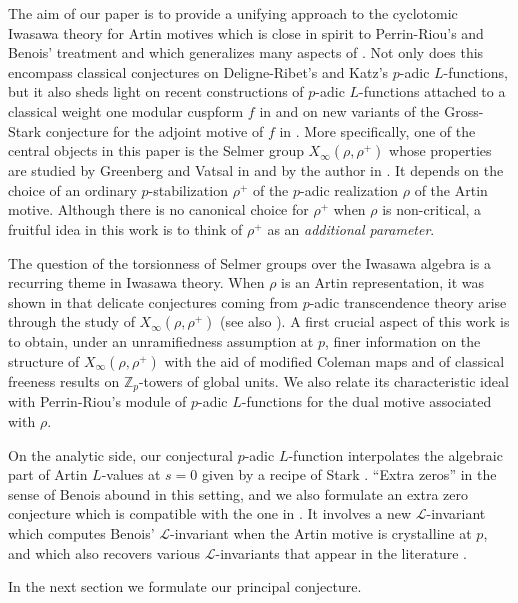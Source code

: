 \documentclass[12pt]{amsart}
\newcommand\Zp{{\mathbb{Z}_p}}
\newcommand\cL{\mathcal{L}}
\theoremstyle{defstyle}
\theoremstyle{thmstyle}
\begin{document}
The aim of our paper is to provide a unifying approach to the cyclotomic Iwasawa theory for Artin motives which is close in spirit to Perrin-Riou's and Benois' treatment and which generalizes many aspects of \cite{BKSANT,buyukboduksakamoto}. Not only does this encompass classical conjectures on Deligne-Ribet's and Katz's $p$-adic $L$-functions, but it also sheds light on recent constructions of $p$-adic $L$-functions attached to a classical weight one modular cuspform $f$ in \cite{bellaiche2016eigencurve,maks} and on new variants of the Gross-Stark conjecture for the adjoint motive of $f$ in \cite{DLR2}. More specifically, one of the central objects in this paper is the Selmer group $X_\infty(\rho,\rho^+)$ whose properties are studied by Greenberg and Vatsal in \cite{GV2020} and by the author in \cite{maks}. It depends on the choice of an ordinary $p$-stabilization $\rho^+$ of the $p$-adic realization $\rho$ of the Artin motive. Although there is no canonical choice for $\rho^+$ when $\rho$ is non-critical, a fruitful idea in this work is to think of $\rho^+$ as an \textit{additional parameter}. 

The question of the torsionness of Selmer groups over the Iwasawa algebra is a recurring theme in Iwasawa theory. When $\rho$ is an Artin representation, it was shown in \cite{maks} that delicate conjectures coming from $p$-adic transcendence theory arise through the study of $X_\infty(\rho,\rho^+)$ (see also \cite{GV2020}). A first crucial aspect of this work is to obtain, under an unramifiedness assumption at $p$, finer information on the structure of $X_\infty(\rho,\rho^+)$ with the aid of modified Coleman maps and of classical freeness results on $\Zp$-towers of global units. We also relate its characteristic ideal with Perrin-Riou's module of $p$-adic $L$-functions for the dual motive associated with $\rho$.

On the analytic side, our conjectural $p$-adic $L$-function interpolates the algebraic part of Artin $L$-values at $s=0$ given by a recipe of Stark \cite{stark2,tate}. ``Extra zeros'' in the sense of Benois abound in this setting, and we also formulate an extra zero conjecture which is compatible with the one in \cite{benoiscrys}. It involves a new $\cL$-invariant which computes Benois' $\cL$-invariant when the Artin motive is crystalline at $p$, and which also recovers various $\cL$-invariants that appear in the literature \cite{gross1981padic,riveroadjoint,rosetrotgervatsal,buyukboduksakamoto}.

In the next section we formulate our principal conjecture.
\end{document}
